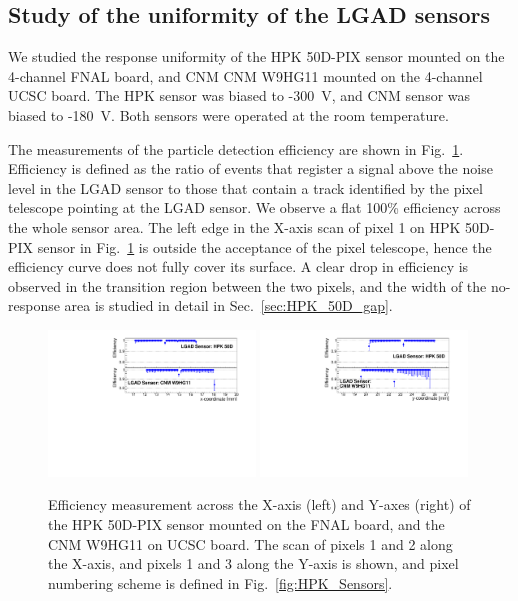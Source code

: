 \documentclass[preprint,1p]{elsarticle}
\begin{document}
\subsection{Study of the uniformity of the LGAD sensors}
\label{sec:HPK_CNM_uniformity}

We studied the response uniformity of the HPK 50D-PIX sensor mounted on the
4-channel FNAL board, and CNM CNM W9HG11 mounted on the 4-channel UCSC board.
The HPK sensor was biased to -300~V, and CNM sensor was biased to -180~V. Both
sensors were operated at the room temperature.

The measurements of the particle detection efficiency are shown in
Fig.~\ref{fig:FNAL_HPK50_effXY}. Efficiency is defined as the ratio of events
that register a signal above the noise level in the LGAD sensor to those that
contain a track identified by the pixel telescope pointing at the LGAD sensor.
We observe a flat 100\% efficiency across the whole sensor area. The left edge
in the X-axis scan of pixel 1 on HPK 50D-PIX sensor in
Fig.~\ref{fig:FNAL_HPK50_effXY} is outside the acceptance of the pixel
telescope, hence the efficiency curve does not fully cover its surface. A clear
drop in efficiency is observed in the transition region between the two pixels,
and the width of the no-response area is studied in detail in
Sec.~\ref{sec:HPK_50D_gap}.

\begin{figure}[htbp] 
\centering
\includegraphics[width=0.49\textwidth]{figs/HPK50DVsCNM_Efficiency_vs_X.pdf} 
\includegraphics[width=0.49\textwidth]{figs/HPK50DVsCNM_Efficiency_vs_Y.pdf} 
\caption{Efficiency measurement across the X-axis (left) and Y-axes (right) of the HPK 50D-PIX sensor mounted on the FNAL board, and the CNM W9HG11 on UCSC board. The scan of pixels 1 and 2 along the X-axis, and pixels 1 and 3 along the Y-axis is shown, and pixel numbering scheme is defined in Fig.~\ref{fig:HPK_Sensors}.} 
\label{fig:FNAL_HPK50_effXY} 
\end{figure} 
\end{document}
